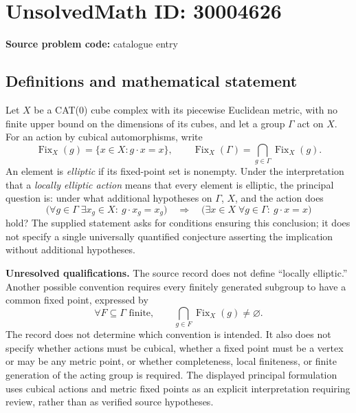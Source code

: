 \documentclass[11pt]{article}
\begin{document}
\section*{UnsolvedMath ID: 30004626}
\textbf{Source problem code:} catalogue entry
\subsection{Definitions and mathematical statement}
Let \(X\) be a CAT(0) cube complex with its piecewise Euclidean metric, with no finite upper bound on the dimensions of its cubes, and let a group \(\Gamma\) act on \(X\). For an action by cubical automorphisms, write
\[
\operatorname{Fix}_X(g)=\{x\in X:g\cdot x=x\},\qquad
\operatorname{Fix}_X(\Gamma)=\bigcap_{g\in\Gamma}\operatorname{Fix}_X(g).
\]
An element is \emph{elliptic} if its fixed-point set is nonempty. Under the interpretation that a \emph{locally elliptic action} means that every element is elliptic, the principal question is: under what additional hypotheses on \(\Gamma\), \(X\), and the action does
\[
\bigl(\forall g\in\Gamma\;\exists x_g\in X:\ g\cdot x_g=x_g\bigr)
\quad\Longrightarrow\quad
\bigl(\exists x\in X\;\forall g\in\Gamma:\ g\cdot x=x\bigr)
\]
hold? The supplied statement asks for conditions ensuring this conclusion; it does not specify a single universally quantified conjecture asserting the implication without additional hypotheses.

\textbf{Unresolved qualifications.} The source record does not define ``locally elliptic.'' Another possible convention requires every finitely generated subgroup to have a common fixed point, expressed by
\[
\forall F\subseteq\Gamma\text{ finite},\qquad
\bigcap_{g\in F}\operatorname{Fix}_X(g)\ne\varnothing.
\]
The record does not determine which convention is intended. It also does not specify whether actions must be cubical, whether a fixed point must be a vertex or may be any metric point, or whether completeness, local finiteness, or finite generation of the acting group is required. The displayed principal formulation uses cubical actions and metric fixed points as an explicit interpretation requiring review, rather than as verified source hypotheses.
\end{document}
